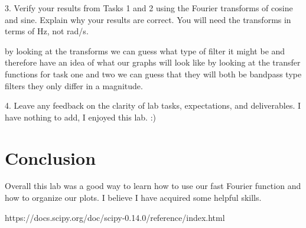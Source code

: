\documentclass[12pt]{report}
\begin{document}
3. Verify your results from Tasks 1 and 2 using the Fourier transforms of cosine and sine.
Explain why your results are correct. You will need the transforms in terms of Hz, not rad/s.

by looking at the transforms we can guess what type of filter it might be and therefore have an idea of what our graphs will look like by looking at the transfer functions for task one and two we can guess that they will both be bandpass type filters they only differ in a magnitude. 

4. Leave any feedback on the clarity of lab tasks, expectations, and deliverables.
    I have nothing to add, I enjoyed this lab. :)

\section{Conclusion}
Overall this lab was a good way to learn how to use our fast Fourier function and how to organize our plots. I believe I have acquired some helpful skills. 


\newpage


\begin{thebibliography}{111}

https://docs.scipy.org/doc/scipy-0.14.0/reference/index.html




\end{thebibliography}
\end{document}
